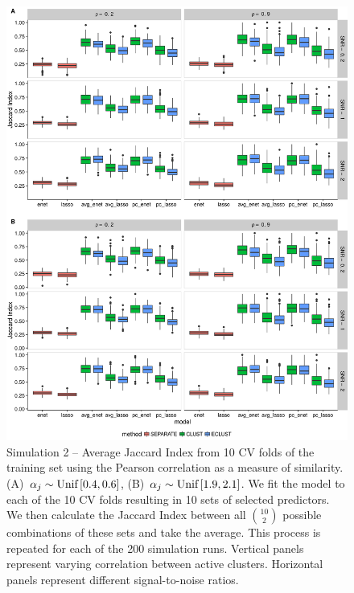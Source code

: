 \begin{figure}[H]
	\centering
	\includegraphics[scale=0.55, keepaspectratio]{./figs/hydra/results/figures/sim2-sept8/jacc_Correlation_sim2.png}
	\caption{Simulation 2 -- Average Jaccard Index from 10 CV folds of the training set using the Pearson correlation as a measure of similarity. \mbox{(A) $\alpha_{j} \sim \textrm{{Unif}}\left[0.4, 0.6\right]$}, \mbox{(B) $\alpha_{j} \sim \textrm{{Unif}}\left[1.9, 2.1\right]$}. We fit the model to each of the 10 CV folds resulting in 10 sets of selected predictors. We then calculate the Jaccard Index between all $\binom{10}{2}$ possible combinations of these sets and take the average. This process is repeated for each of the 200 simulation runs. Vertical panels represent varying correlation between active clusters. Horizontal panels represent different signal-to-noise ratios.}
	\label{fig:jacc_Correlation_sim2}
\end{figure}


